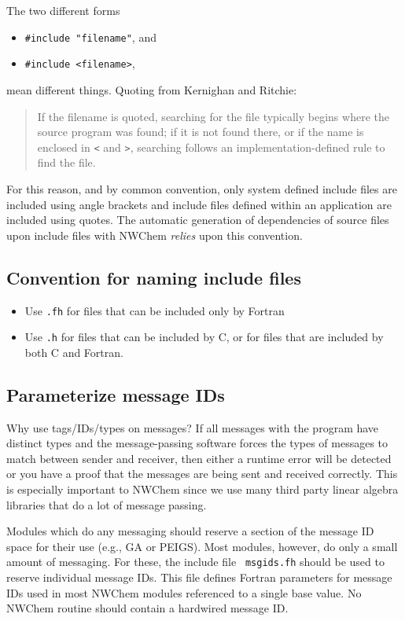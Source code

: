 The two different forms
\begin{itemize}
\item \verb+#include "filename"+, and
\item \verb+#include <filename>+,
\end{itemize}
mean different things.  Quoting from Kernighan and Ritchie:
\begin{quotation}
 If the {\em} filename is quoted, searching for the file typically
 begins where the source program was found; if it is not found there,
 or if the name is enclosed in \verb+<+ and \verb+>+, searching follows
 an implementation-defined rule to find the file.
\end{quotation}
For this reason, and by common convention, only system defined include
files are included using angle brackets and include files defined
within an application are included using quotes.  The
automatic generation of dependencies of source files upon include
files with NWChem {\em relies} upon this convention.

\subsection{Convention for naming include files}

\begin{itemize}
\item Use \verb+.fh+ for files that can be included only by Fortran
\item Use \verb+.h+ for files that can be included by C, or
  for files that are included by both C and Fortran.
\end{itemize}

\subsection{Parameterize message IDs}

Why use tags/IDs/types on messages?  If all messages with the program
have distinct types and the message-passing software forces the types
of messages to match between sender and receiver, then either a
runtime error will be detected or you have a proof that the messages
are being sent and received correctly.  This is especially important
to NWChem since we use many third party linear algebra libraries that
do a lot of message passing.

Modules which do any messaging should reserve a section of the message
ID space for their use (e.g., GA or PEIGS).  Most modules, however, do
only a small amount of messaging.  For these, the include file {\tt
  msgids.fh} should be used to reserve individual message IDs.  This
file defines Fortran parameters for message IDs used in most NWChem
modules referenced to a single base value.  No NWChem routine should
contain a hardwired message ID.

